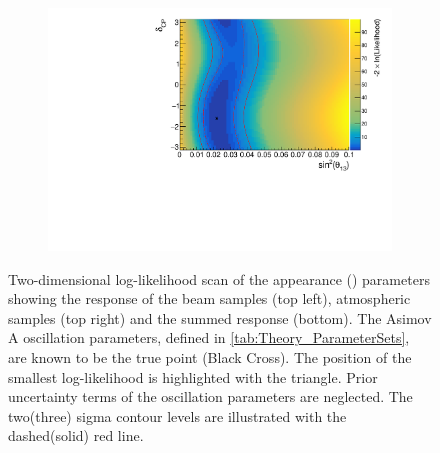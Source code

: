 \begin{figure}[h]
\begin{subfigure}[t]{1.0\textwidth}
    \includegraphics[width=\textwidth, trim={0mm 0mm 0mm 0mm}, clip,page=3]{Figures/OA/AppearanceScans.pdf}
  \end{subfigure}
  \caption{Two-dimensional log-likelihood scan of the appearance (\text{\textendash}) parameters showing the response of the beam samples (top left), atmospheric samples (top right) and the summed response (bottom). The Asimov A oscillation parameters, defined in \autoref{tab:Theory_ParameterSets}, are known to be the true point (Black Cross). The position of the smallest log-likelihood is highlighted with the triangle. Prior uncertainty terms of the oscillation parameters are neglected. The two(three) sigma contour levels are illustrated with the dashed(solid) red line.}
  \label{fig:OscillationAnalysis_2DLLHOscScans_App}
\end{figure}

